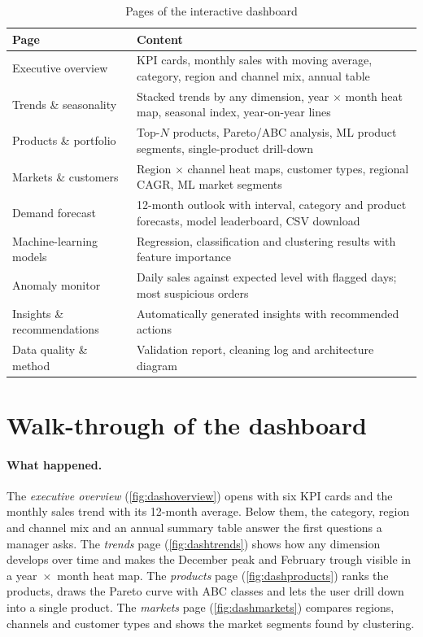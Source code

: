 \begin{table}[htbp]\centering\small
\caption{Pages of the interactive dashboard}\label{tab:pages}
\begin{tabularx}{\linewidth}{@{}lX@{}}
\toprule
\textbf{Page} & \textbf{Content} \\ \midrule
Executive overview & KPI cards, monthly sales with moving average, category, region and channel mix, annual table \\
Trends \& seasonality & Stacked trends by any dimension, year $\times$ month heat map, seasonal index, year-on-year lines \\
Products \& portfolio & Top-$N$ products, Pareto/ABC analysis, ML product segments, single-product drill-down \\
Markets \& customers & Region $\times$ channel heat maps, customer types, regional CAGR, ML market segments \\
Demand forecast & 12-month outlook with interval, category and product forecasts, model leaderboard, CSV download \\
Machine-learning models & Regression, classification and clustering results with feature importance \\
Anomaly monitor & Daily sales against expected level with flagged days; most suspicious orders \\
Insights \& recommendations & Automatically generated insights with recommended actions \\
Data quality \& method & Validation report, cleaning log and architecture diagram \\ \bottomrule
\end{tabularx}
\end{table}

\section{Walk-through of the dashboard}
\paragraph{What happened.} The \emph{executive overview} (\cref{fig:dashoverview}) opens with six KPI cards and
the monthly sales trend with its 12-month average. Below them, the category, region and channel mix and an
annual summary table answer the first questions a manager asks. The \emph{trends} page
(\cref{fig:dashtrends}) shows how any dimension develops over time and makes the December peak and February
trough visible in a year~$\times$~month heat map. The \emph{products} page (\cref{fig:dashproducts}) ranks the
products, draws the Pareto curve with ABC classes and lets the user drill down into a single product. The
\emph{markets} page (\cref{fig:dashmarkets}) compares regions, channels and customer types and shows the
market segments found by clustering.


